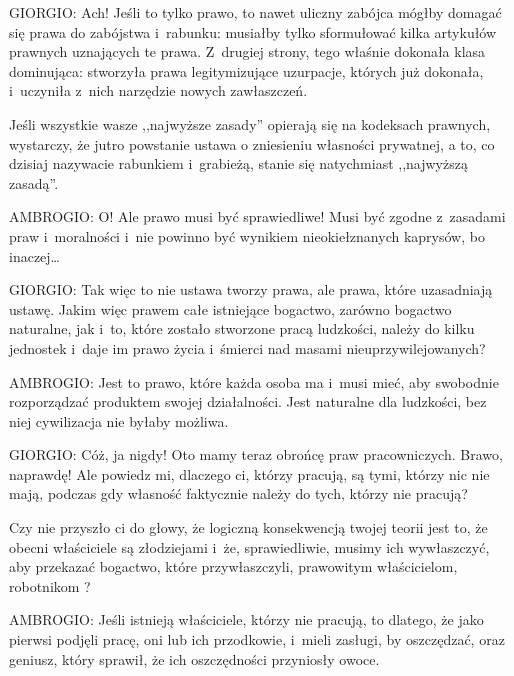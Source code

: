 \documentclass[oneside,polish,11pt,sfheadings]{mwbk}
\begin{document}
 
\noindent GIORGIO: Ach! Jeśli to tylko prawo, to nawet uliczny zabójca mógłby domagać się prawa do zabójstwa i~rabunku: musiałby
tylko sformułować kilka artykułów prawnych uznających te prawa. Z~drugiej strony, tego właśnie dokonała klasa
dominująca: stworzyła prawa legitymizujące uzurpacje, których już dokonała, i~uczyniła z~nich narzędzie nowych
zawłaszczeń. 

 
Jeśli wszystkie wasze ,,najwyższe zasady'' opierają się na kodeksach prawnych, wystarczy, że jutro powstanie ustawa o
zniesieniu własności prywatnej, a to, co dzisiaj nazywacie rabunkiem i~grabieżą, stanie się natychmiast ,,najwyższą
zasadą''. 




 
\noindent AMBROGIO: O! Ale prawo musi być sprawiedliwe! Musi być zgodne z~zasadami praw i~moralności i~nie powinno być wynikiem
nieokiełznanych kaprysów, bo inaczej\ldots 




 
\noindent GIORGIO: Tak więc to nie ustawa tworzy prawa, ale prawa, które uzasadniają ustawę. Jakim więc prawem całe istniejące
bogactwo, zarówno bogactwo naturalne, jak i~to, które zostało stworzone pracą ludzkości, należy do kilku jednostek i~daje im prawo życia i~śmierci nad masami nieuprzywilejowanych? 




 
\noindent AMBROGIO: Jest to prawo, które każda osoba ma i~musi mieć, aby swobodnie rozporządzać produktem swojej działalności.
Jest naturalne dla ludzkości, bez niej cywilizacja nie byłaby możliwa. 




 
\noindent GIORGIO: Cóż, ja nigdy! Oto mamy teraz obrońcę praw pracowniczych. Brawo, naprawdę! Ale powiedz mi, dlaczego ci, którzy
pracują, są tymi, którzy nic nie mają, podczas gdy własność faktycznie należy do tych, którzy nie pracują? 

 
Czy nie przyszło ci do głowy, że logiczną konsekwencją twojej teorii jest to, że obecni właściciele są złodziejami i~że,
sprawiedliwie, musimy ich wywłaszczyć, aby przekazać bogactwo, które przywłaszczyli, prawowitym właścicielom,
robotnikom ? 




 
\noindent AMBROGIO: Jeśli istnieją właściciele, którzy nie pracują, to dlatego, że jako pierwsi podjęli pracę, oni lub ich
przodkowie, i~mieli zasługi, by oszczędzać, oraz geniusz, który sprawił, że ich oszczędności przyniosły owoce. 
\end{document}
